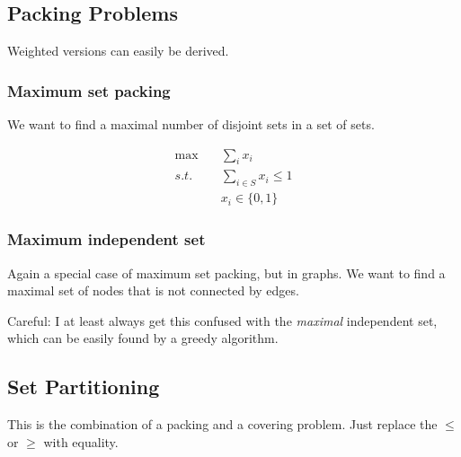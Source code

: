 \subsection{Packing Problems}

Weighted versions can easily be derived.

\subsubsection{Maximum set packing}
We want to find a maximal number of disjoint sets in a set of sets.

\begin{align*}
\max \quad & \sum_{i} x_i\\
s.t. \quad & \sum_{i\in S} x_i \leq 1\\
	& x_i \in \{0,1\}
\end{align*}
\subsubsection{Maximum independent set}

Again a special case of maximum set packing, but in graphs. We want to find a maximal set of nodes that is not connected by edges.

Careful: I at least always get this confused with the \emph{maximal} independent set, which can be easily found by a greedy algorithm.
\subsection{Set Partitioning}
This is the combination of a packing and a covering problem. Just replace the $\leq$ or $\geq$ with equality.